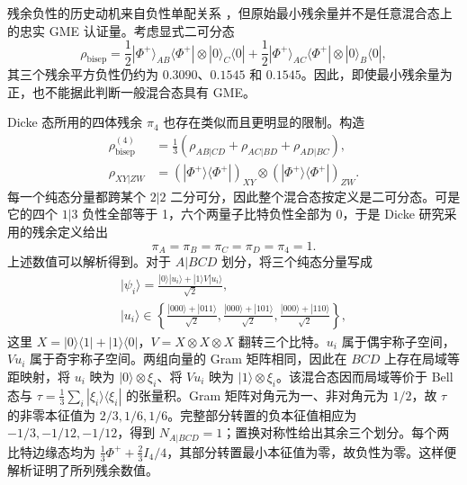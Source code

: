 \documentclass[UTF8,11pt,a4paper,fontset=none]{ctexart}
\begin{document}
残余负性的历史动机来自负性单配关系 \cite{OuFan2007}，但原始最小残余量并不是任意混合态上的忠实 GME 认证量。考虑显式二可分态
\begin{equation}
\rho_{\mathrm{bisep}}=\frac12|\Phi^+\rangle_{AB}\langle\Phi^+|\otimes|0\rangle_C\langle0|
+\frac12|\Phi^+\rangle_{AC}\langle\Phi^+|\otimes|0\rangle_B\langle0|,
\label{eq:biseparable-counterexample}
\end{equation}
其三个残余平方负性仍约为 $0.3090$、$0.1545$ 和 $0.1545$。因此，即使最小残余量为正，也不能据此判断一般混合态具有 GME。

Dicke 态所用的四体残余 $\pi_4$ 也存在类似而且更明显的限制。构造
\begin{equation}
\begin{aligned}
\rho_{\mathrm{bisep}}^{(4)}&=\frac13\left(\rho_{AB|CD}+\rho_{AC|BD}+\rho_{AD|BC}\right),\\
\rho_{XY|ZW}&=\left(|\Phi^+\rangle\langle\Phi^+|\right)_{XY}
\otimes\left(|\Phi^+\rangle\langle\Phi^+|\right)_{ZW}.
\end{aligned}
\label{eq:pi4-counterexample}
\end{equation}
每一个纯态分量都跨某个 $2|2$ 二分可分，因此整个混合态按定义是二可分态。可是它的四个 $1|3$ 负性全部等于 1，六个两量子比特负性全部为 0，于是 Dicke 研究采用的残余定义给出
\begin{equation}
\pi_A=\pi_B=\pi_C=\pi_D=\pi_4=1.
\end{equation}
上述数值可以解析得到。对于 $A|BCD$ 划分，将三个纯态分量写成
\begin{equation}
\begin{aligned}
|\psi_i\rangle=\frac{|0\rangle|u_i\rangle+|1\rangle V|u_i\rangle}{\sqrt2},\\
|u_i\rangle\in\left\{
\frac{|000\rangle+|011\rangle}{\sqrt2},
\frac{|000\rangle+|101\rangle}{\sqrt2},
\frac{|000\rangle+|110\rangle}{\sqrt2}\right\},
\end{aligned}
\end{equation}
这里 $X=|0\rangle\langle1|+|1\rangle\langle0|$，$V=X\otimes X\otimes X$ 翻转三个比特。$u_i$ 属于偶宇称子空间，$Vu_i$ 属于奇宇称子空间。两组向量的 Gram 矩阵相同，因此在 $BCD$ 上存在局域等距映射，将 $u_i$ 映为 $|0\rangle\otimes\xi_i$、将 $Vu_i$ 映为 $|1\rangle\otimes\xi_i$。该混合态因而局域等价于 Bell 态与 $\tau=\frac13\sum_i|\xi_i\rangle\langle\xi_i|$ 的张量积。Gram 矩阵对角元为一、非对角元为 $1/2$，故 $\tau$ 的非零本征值为 $2/3,1/6,1/6$。完整部分转置的负本征值相应为 $-1/3,-1/12,-1/12$，得到 $N_{A|BCD}=1$；置换对称性给出其余三个划分。每个两比特边缘态均为 $\frac13\Phi^++\frac23 I_4/4$，其部分转置最小本征值为零，故负性为零。这样便解析证明了所列残余数值。
\end{document}
